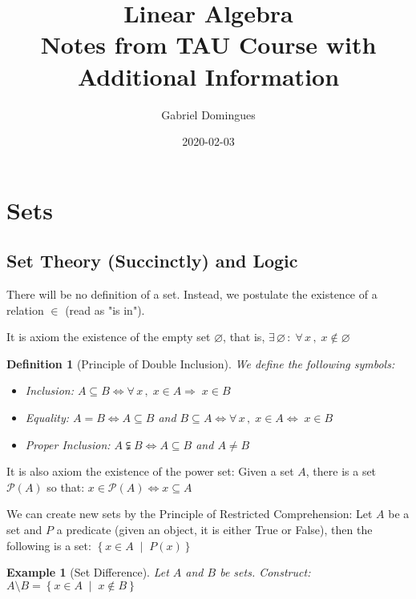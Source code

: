 \documentclass[12pt]{article}
\title{%
  Linear Algebra \\
  \large Notes from TAU Course with Additional Information}
\author{Gabriel Domingues}
\date{2020-02-03}
\let\emptyset\varnothing
\let\RA\Rightarrow
\let\LR\Leftrightarrow
\newcommand{\set}[2]{\left\{{#1}\;\middle|\;{#2}\right\}}
\newcommand{\Forall}[1]{\forall\,{#1}\,,\;}
\newcommand{\Exist}[1]{\exists\,{#1}\,:\;}
\newtheorem{definition}{Definition}[subsection]
\newtheorem{example}{Example}[subsection]
\begin{document}
\maketitle

\setlength{\parindent}{0ex}
\setlength{\parskip}{1em}

\tableofcontents

\pagebreak

\section{Sets}

\subsection{Set Theory (Succinctly) and Logic}

There will be no definition of a set. Instead, we postulate the existence of a relation $\in$ (read as "is in"). 

It is axiom the existence of the empty set $\emptyset$, that is, $\Exist{\emptyset}\Forall{x} x\notin\emptyset$

\begin{definition}[Principle of Double Inclusion]
  We define the following symbols:
  \begin{itemize}
    \item[] Inclusion: $A\subseteq B\LR \Forall{x} x\in A\RA \;x\in B$
    \item[] Equality: $A=B\LR A\subseteq B$ and $B\subseteq A\LR \Forall{x} x\in A\LR \;x\in B$
    \item[] Proper Inclusion: $A\subsetneqq B\LR A\subseteq B$ and $A\neq B$
  \end{itemize}
  
\end{definition}

It is also axiom the existence of the power set: Given a set $A$, there is a set $\mathcal{P}(A)$ so that: $x\in \mathcal{P}(A) \LR x \subseteq A$

We can create new sets by the Principle of Restricted Comprehension: Let $A$ be a set and $P$ a predicate (given an object, it is either True or False), then the following is a set: $\set{x\in A}{P(x)}$

\begin{example}[Set Difference]
  Let $A$ and $B$ be sets. Construct: $A\setminus B=\set{x\in A}{x\notin B}$
\end{example}
\end{document}
